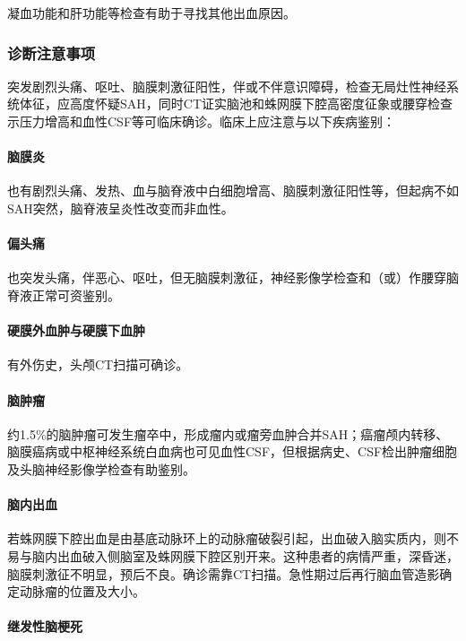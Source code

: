 凝血功能和肝功能等检查有助于寻找其他出血原因。

\subsubsection{诊断注意事项}

突发剧烈头痛、呕吐、脑膜刺激征阳性，伴或不伴意识障碍，检查无局灶性神经系统体征，应高度怀疑SAH，同时CT证实脑池和蛛网膜下腔高密度征象或腰穿检查示压力增高和血性CSF等可临床确诊。临床上应注意与以下疾病鉴别：

\paragraph{脑膜炎}

也有剧烈头痛、发热、血与脑脊液中白细胞增高、脑膜刺激征阳性等，但起病不如SAH突然，脑脊液呈炎性改变而非血性。

\paragraph{偏头痛}

也突发头痛，伴恶心、呕吐，但无脑膜刺激征，神经影像学检查和（或）作腰穿脑脊液正常可资鉴别。

\paragraph{硬膜外血肿与硬膜下血肿}

有外伤史，头颅CT扫描可确诊。

\paragraph{脑肿瘤}

约1.5\%的脑肿瘤可发生瘤卒中，形成瘤内或瘤旁血肿合并SAH；癌瘤颅内转移、脑膜癌病或中枢神经系统白血病也可见血性CSF，但根据病史、CSF检出肿瘤细胞及头脑神经影像学检查有助鉴别。

\paragraph{脑内出血}

若蛛网膜下腔出血是由基底动脉环上的动脉瘤破裂引起，出血破入脑实质内，则不易与脑内出血破入侧脑室及蛛网膜下腔区别开来。这种患者的病情严重，深昏迷，脑膜刺激征不明显，预后不良。确诊需靠CT扫描。急性期过后再行脑血管造影确定动脉瘤的位置及大小。

\paragraph{继发性脑梗死}

